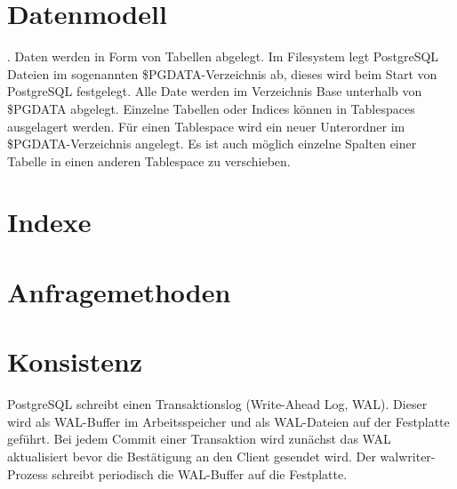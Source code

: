 \section{Datenmodell}
. Daten werden in Form von Tabellen abgelegt. Im Filesystem legt PostgreSQL Dateien im sogenannten \$PGDATA-Verzeichnis ab, dieses wird beim Start von PostgreSQL festgelegt. Alle Date werden im Verzeichnis Base unterhalb von \$PGDATA abgelegt. Einzelne Tabellen oder Indices können in Tablespaces ausgelagert werden. Für einen Tablespace wird ein neuer Unterordner im \$PGDATA-Verzeichnis angelegt. Es ist auch möglich einzelne Spalten einer Tabelle in einen anderen Tablespace zu verschieben.
\section{Indexe}
\section{Anfragemethoden}
\section{Konsistenz}
PostgreSQL schreibt einen Transaktionslog (Write-Ahead Log, WAL).
Dieser wird als WAL-Buffer im Arbeitsspeicher und als WAL-Dateien auf der Festplatte geführt.
Bei jedem Commit einer Transaktion wird zunächst das WAL aktualisiert bevor die Bestätigung an den Client gesendet wird.
Der walwriter-Prozess schreibt periodisch die WAL-Buffer auf die Festplatte.
